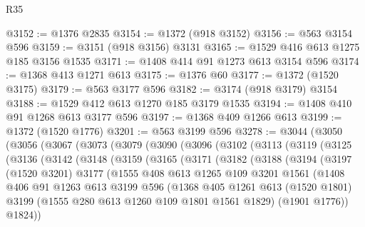 \begin{lexlean}{R35}
\begin{coremodule}
@3152 := @1376 @2835
@3154 := @1372 (@918 @3152)
@3156 := @563 @3154 @596
@3159 := @3151 (@918 @3156) @3131
@3165 := @1529 @416 @613 @1275 @185 @3156 @1535
@3171 := @1408 @414 @91 @1273 @613 @3154 @596
@3174 := @1368 @413 @1271 @613
@3175 := @1376 @60
@3177 := @1372 (@1520 @3175)
@3179 := @563 @3177 @596
@3182 := @3174 (@918 @3179) @3154
@3188 := @1529 @412 @613 @1270 @185 @3179 @1535
@3194 := @1408 @410 @91 @1268 @613 @3177 @596
@3197 := @1368 @409 @1266 @613
@3199 := @1372 (@1520 @1776)
@3201 := @563 @3199 @596
@3278 := @3044
    (@3050
      (@3056
        (@3067
          (@3073
            (@3079
              (@3090
                (@3096
                  (@3102
                    (@3113
                      (@3119
                        (@3125
                          (@3136
                            (@3142
                              (@3148
                                (@3159
                                  (@3165
                                    (@3171
                                      (@3182
                                        (@3188
                                          (@3194
                                            (@3197
                                              (@1520 @3201)
                                              @3177
                                              (@1555
                                                @408
                                                @613
                                                @1265
                                                @109
                                                @3201
                                                @1561
                                                (@1408
                                                  @406
                                                  @91
                                                  @1263
                                                  @613
                                                  @3199
                                                  @596
                                                  (@1368
                                                    @405
                                                    @1261
                                                    @613
                                                    (@1520 @1801)
                                                    @3199
                                                    (@1555 @280 @613 @1260 @109 @1801 @1561 @1829)
                                                    (@1901 @1776))
                                                  @1824))

\end{coremodule}
\end{lexlean}
